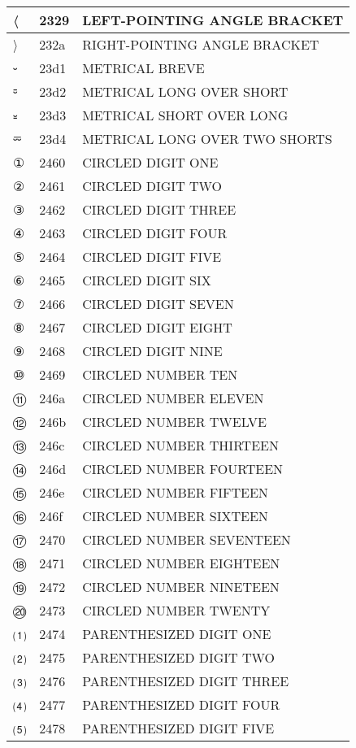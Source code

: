 \documentclass[12pt,letterpaper,openany]{book}
\begin{document}
\begin{center}
\begin{supertabular}{|m{0.25in}|m{0.5in}|m{4in}|}
			〈 & 2329 & LEFT-POINTING ANGLE BRACKET\\\hline
			〉 & 232a & RIGHT-POINTING ANGLE BRACKET\\\hline
			⏑ & 23d1 & METRICAL BREVE\\\hline
			⏒ & 23d2 & METRICAL LONG OVER SHORT\\\hline
			⏓ & 23d3 & METRICAL SHORT OVER LONG\\\hline
			⏔ & 23d4 & METRICAL LONG OVER TWO SHORTS\\\hline
			① & 2460 & CIRCLED DIGIT ONE\\\hline
			② & 2461 & CIRCLED DIGIT TWO\\\hline
			③ & 2462 & CIRCLED DIGIT THREE\\\hline
			④ & 2463 & CIRCLED DIGIT FOUR\\\hline
			⑤ & 2464 & CIRCLED DIGIT FIVE\\\hline
			⑥ & 2465 & CIRCLED DIGIT SIX\\\hline
			⑦ & 2466 & CIRCLED DIGIT SEVEN\\\hline
			⑧ & 2467 & CIRCLED DIGIT EIGHT\\\hline
			⑨ & 2468 & CIRCLED DIGIT NINE\\\hline
			⑩ & 2469 & CIRCLED NUMBER TEN\\\hline
			⑪ & 246a & CIRCLED NUMBER ELEVEN\\\hline
			⑫ & 246b & CIRCLED NUMBER TWELVE\\\hline
			⑬ & 246c & CIRCLED NUMBER THIRTEEN\\\hline
			⑭ & 246d & CIRCLED NUMBER FOURTEEN\\\hline
			⑮ & 246e & CIRCLED NUMBER FIFTEEN\\\hline
			⑯ & 246f & CIRCLED NUMBER SIXTEEN\\\hline
			⑰ & 2470 & CIRCLED NUMBER SEVENTEEN\\\hline
			⑱ & 2471 & CIRCLED NUMBER EIGHTEEN\\\hline
			⑲ & 2472 & CIRCLED NUMBER NINETEEN\\\hline
			⑳ & 2473 & CIRCLED NUMBER TWENTY\\\hline
			⑴ & 2474 & PARENTHESIZED DIGIT ONE\\\hline
			⑵ & 2475 & PARENTHESIZED DIGIT TWO\\\hline
			⑶ & 2476 & PARENTHESIZED DIGIT THREE\\\hline
			⑷ & 2477 & PARENTHESIZED DIGIT FOUR\\\hline
			⑸ & 2478 & PARENTHESIZED DIGIT FIVE\\\hline

\end{supertabular}
\end{center}
\end{document}
